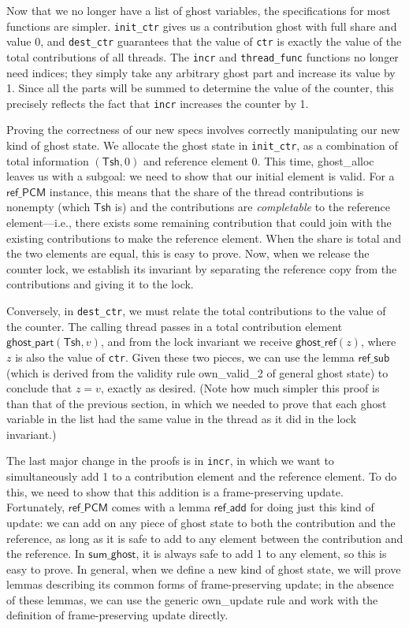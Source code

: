 \documentclass[11pt]{article}
\begin{document}
Now that we no longer have a list of ghost variables, the specifications for most functions are simpler. \texttt{init\_ctr} gives us a contribution ghost with full share and value 0, and \texttt{dest\_ctr} guarantees that the value of \texttt{ctr} is exactly the value of the total contributions of all threads. The \texttt{incr} and \texttt{thread\_func} functions no longer need indices; they simply take any arbitrary ghost part and increase its value by 1. Since all the parts will be summed to determine the value of the counter, this precisely reflects the fact that \texttt{incr} increases the counter by 1.

Proving the correctness of our new specs involves correctly manipulating our new kind of ghost state. We allocate the ghost state in \texttt{init\_ctr}, as a combination of total information $(\mathsf{Tsh}, 0)$ and reference element $0$. This time, \textsf{ghost\_alloc} leaves us with a subgoal: we need to show that our initial element is valid. For a $\mathsf{ref\_PCM}$ instance, this means that the share of the thread contributions is nonempty (which $\mathsf{Tsh}$ is) and the contributions are \emph{completable} to the reference element---i.e., there exists some remaining contribution that could join with the existing contributions to make the reference element. When the share is total and the two elements are equal, this is easy to prove. Now, when we release the counter lock, we establish its invariant by separating the reference copy from the contributions and giving it to the lock.

Conversely, in \texttt{dest\_ctr}, we must relate the total contributions to the value of the counter. The calling thread passes in a total contribution element $\mathsf{ghost\_part}(\mathsf{Tsh}, v)$, and from the lock invariant we receive $\mathsf{ghost\_ref}(z)$, where $z$ is also the value of \texttt{ctr}. Given these two pieces, we can use the lemma $\mathsf{ref\_sub}$ (which is derived from the validity rule \textsf{own\_valid\_2} of general ghost state) to conclude that $z = v$, exactly as desired. (Note how much simpler this proof is than that of the previous section, in which we needed to prove that each ghost variable in the list had the same value in the thread as it did in the lock invariant.)

The last major change in the proofs is in \texttt{incr}, in which we want to simultaneously add 1 to a contribution element and the reference element. To do this, we need to show that this addition is a frame-preserving update. Fortunately, $\mathsf{ref\_PCM}$ comes with a lemma $\mathsf{ref\_add}$ for doing just this kind of update: we can add on any piece of ghost state to both the contribution and the reference, as long as it is safe to add to any element between the contribution and the reference. In $\mathsf{sum\_ghost}$, it is always safe to add 1 to any element, so this is easy to prove. In general, when we define a new kind of ghost state, we will prove lemmas describing its common forms of frame-preserving update; in the absence of these lemmas, we can use the generic \textsf{own\_update} rule and work with the definition of frame-preserving update directly.
\end{document}
